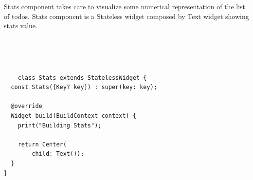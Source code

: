 	Stats component takes care to visualize some numerical representation of the list of todos. Stats component is a Stateless widget composed by Text widget showing stats value.
	
	\mbox{}\\
	\begin{code}
	 \mbox{}
		\label{code:2.13}
	\begin{verbatim}
		

	class Stats extends StatelessWidget {
  const Stats({Key? key}) : super(key: key);

  @override
  Widget build(BuildContext context) {
    print("Building Stats");

    return Center(
        child: Text());
  }
}
	\end{verbatim}
	\end{code}
	\mbox{}
	
	
